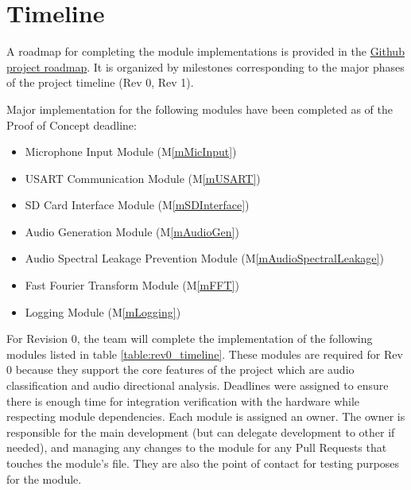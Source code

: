 \documentclass[12pt, titlepage]{article}
\newcommand{\mref}[1]{M\ref{#1}}
\begin{document}
\section{Timeline}

A roadmap for completing the module implementations is provided in the
\href{https://github.com/orgs/Team6-SixSense/projects/7}{Github project
roadmap}. It is organized by milestones corresponding to the major phases of the
project timeline (Rev 0, Rev 1).

Major implementation for the following modules have been completed as of the
Proof of Concept deadline:
\begin{itemize}
\item Microphone Input Module (\mref{mMicInput})
\item USART Communication Module (\mref{mUSART})
\item SD Card Interface Module (\mref{mSDInterface})
\item Audio Generation Module (\mref{mAudioGen})
\item Audio Spectral Leakage Prevention Module (\mref{mAudioSpectralLeakage})
\item Fast Fourier Transform Module (\mref{mFFT})
\item Logging Module (\mref{mLogging})
\end{itemize}

For Revision 0, the team will complete the implementation of the
following modules listed in table \ref{table:rev0_timeline}.
These modules are required for Rev 0 because they support the core features of
the project which are audio classification and audio directional analysis.
Deadlines were assigned to ensure there is enough time for integration
verification with the hardware while respecting module dependencies. Each
module is assigned an owner. The owner is responsible for the main development
(but can delegate development to other if needed),
and managing any changes to the module for any Pull Requests that touches the
module's file. They are also the point of contact for testing purposes for the
module.
\end{document}

